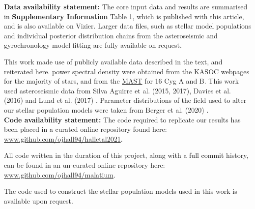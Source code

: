 \textbf{Data availability statement:} The core input data and results are summarised in  \textbf{Supplementary Information} Table 1, which is published with this article, and is also available on Vizier. Larger data files, such as stellar model populations and individual posterior distribution chains from the asteroseismic and gyrochronology model fitting are fully available on request.

This work made use of publicly available data described in the text, and reiterated here. \kepler power spectral density  were obtained from the \href{http://kasoc.phys.au.dk/}{KASOC} webpages for the majority of stars, and from the \href{https://archive.
		stsci.edu/prepds/kepseismic/}{MAST} for 16 Cyg A and B. This work used asteroseismic data from Silva Aguirre et al. (2015, 2017), Davies et al. (2016) and Lund et al. (2017) \cite{m_silvaaguirre+2015, m_silvaaguirre+2017,m_davies+2016, m_lund+2017}. Parameter distributions of the \kepler field used to alter our stellar population models were taken from Berger et al. (2020) \cite{m_berger+2020}.\\
	
\textbf{Code availability statement:} The code required to replicate our results has been placed in a curated online repository found here: \url{www.github.com/ojhall94/halletal2021}. 

All code written in the duration of this project, along with a full commit history, can be found in an un-curated online repository here: \url{www.github.com/ojhall94/malatium}. 

The code used to construct the stellar population models used in this work is available upon request.



%